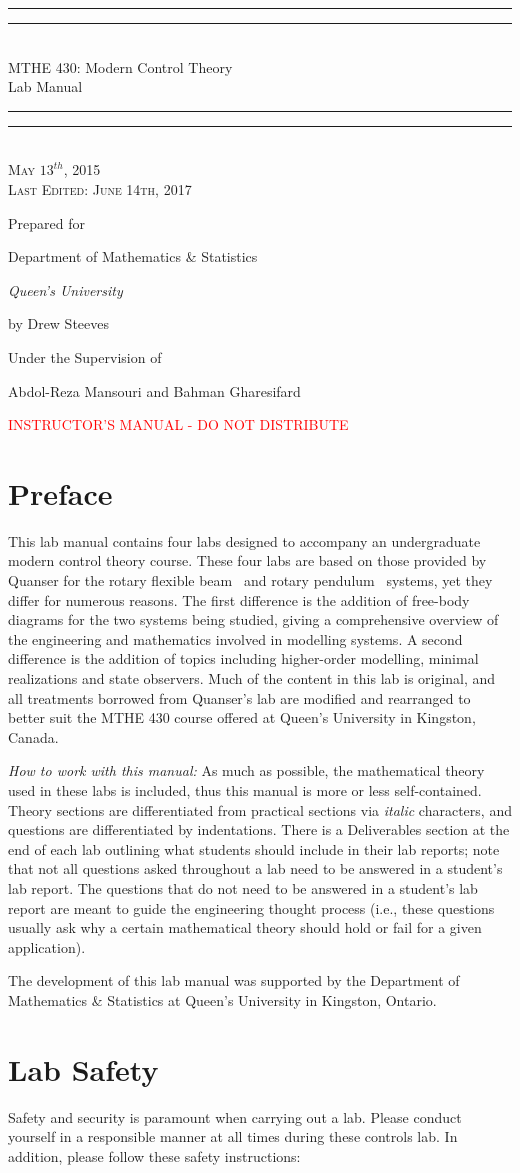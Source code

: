 \documentclass[12pt]{report}
\newcommand\drew[1]{\textcolor{red}{#1}}
\newcommand*{\titleGP}{\begingroup %
\centering %
\vspace*{\baselineskip} %

\rule{\textwidth}{1.6pt}\vspace*{-\baselineskip}\vspace*{2pt} %
\rule{\textwidth}{0.4pt}\\[\baselineskip] %

{\LARGE MTHE 430: Modern Control Theory\\ \vspace{2mm} Lab Manual}\\[0.2\baselineskip] %

\rule{\textwidth}{0.4pt}\vspace*{-\baselineskip}\vspace{3.2pt} %
\rule{\textwidth}{1.6pt}\\[\baselineskip] %

\scshape %
May $13^{th}$, 2015 \\
Last Edited:  June 14th, 2017\par %

\vspace*{6\baselineskip} %

Prepared for \\[\baselineskip]
{\Large Department of Mathematics \& Statistics\par}
{\itshape Queen's University\par}

\vspace{4mm}
by Drew Steeves

\vspace{8mm}
Under the Supervision of

\vspace{1mm}
Abdol-Reza Mansouri and Bahman Gharesifard

\vspace{30mm}
\drew{INSTRUCTOR'S MANUAL - DO NOT DISTRIBUTE}


\vfill

\endgroup}
\begin{document}
\titleGP
\thispagestyle{empty}
\newpage
\tableofcontents
\newpage

\section{Preface} \label{section:preface}
This lab manual contains four labs designed to accompany an undergraduate modern control theory course. These four labs are based on those provided by Quanser for the rotary flexible beam~\cite{Q-Flex-Beam} and rotary pendulum~\cite{Q-Rot-Pen} systems, yet they differ for numerous reasons. The first difference is the addition of free-body diagrams for the two systems being studied, giving a comprehensive overview of the engineering and mathematics involved in modelling systems. A second difference is the addition of topics including higher-order modelling, minimal realizations and state observers. Much of the content in this lab is original, and all treatments borrowed from Quanser's lab are modified and rearranged to better suit the MTHE 430 course offered at Queen's University in Kingston, Canada.

\emph{How to work with this manual:} As much as possible, the mathematical theory used in these labs is included, thus this manual is more or less self-contained. Theory sections are differentiated from practical sections via \emph{italic} characters, and questions are differentiated by indentations. There is a Deliverables section at the end of each lab outlining what students should include in their lab reports; note that not all questions asked throughout a lab need to be answered in a student's lab report. The questions that do not need to be answered in a student's lab report are meant to guide the engineering thought process (i.e., these questions usually ask why a certain mathematical theory should hold or fail for a given application).

The development of this lab manual was supported by the Department of Mathematics \& Statistics at Queen's University in Kingston, Ontario.

\newpage
\section{Lab Safety} \label{section:safety}
Safety and security is paramount when carrying out a lab. Please conduct yourself in a responsible manner at all times during these controls lab. In addition, please follow these safety instructions:
\end{document}

